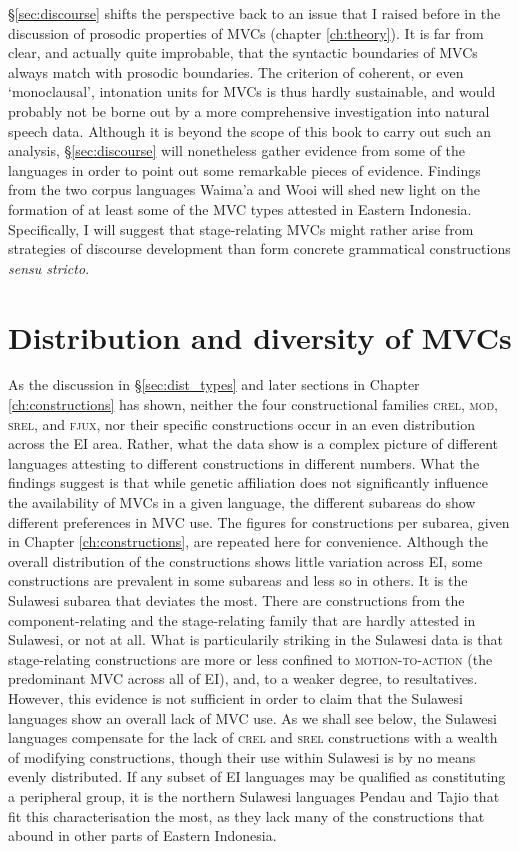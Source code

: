 §\ref{sec:discourse} shifts the perspective back to an issue that I raised before in the discussion of prosodic properties of MVCs (chapter \ref{ch:theory}). It is far from clear, and actually quite improbable, that the syntactic boundaries of MVCs always match with prosodic boundaries. The criterion of coherent, or even `monoclausal', intonation units for MVCs is thus hardly sustainable, and would probably not be borne out by a more comprehensive investigation into natural speech data. Although it is beyond the scope of this book to carry out such an analysis, §\ref{sec:discourse} will nonetheless gather evidence from some of the languages in order to point out some remarkable pieces of evidence. Findings from the two corpus languages Waima'a and Wooi will shed new light on the formation of at least some of the MVC types attested in Eastern Indonesia. Specifically, I will suggest that stage-relating MVCs might rather arise from strategies of discourse development than form concrete grammatical constructions \textit{sensu stricto}.

\section{Distribution and diversity of MVCs} \label{sec:distribution}

As the discussion in §\ref{sec:dist_types} and later sections in Chapter \ref{ch:constructions} has shown, neither the four constructional families \textsc{crel}, \textsc{mod}, \textsc{srel}, and \textsc{fjux}, nor their specific constructions occur in an even distribution across the EI area. Rather, what the data show is a complex picture of different languages attesting to different constructions in different numbers. What the findings suggest is that while genetic affiliation does not significantly influence the availability of MVCs in a given language, the different subareas do show different preferences in MVC use. The figures for constructions per subarea, given in Chapter \ref{ch:constructions}, are repeated here for convenience. Although the overall distribution of the constructions shows little variation across EI, some constructions are prevalent in some subareas and less so in others. It is the Sulawesi subarea that deviates the most. There are constructions from the component-relating and the stage-relating family that are hardly attested in Sulawesi, or not at all. What is particularily striking in the Sulawesi data is that stage-relating constructions are more or less confined to \textsc{motion-to-action} (the predominant MVC across all of EI), and, to a weaker degree, to resultatives. However, this evidence is not sufficient in order to claim that the Sulawesi languages show an overall lack of MVC use. As we shall see below, the Sulawesi languages compensate for the lack of \textsc{crel} and \textsc{srel} constructions with a wealth of modifying constructions, though their use within Sulawesi is by no means evenly distributed. If any subset of EI languages may be qualified as constituting a peripheral group, it is the northern Sulawesi languages Pendau and Tajio that fit this characterisation the most, as they lack many of the constructions that abound in other parts of Eastern Indonesia.

